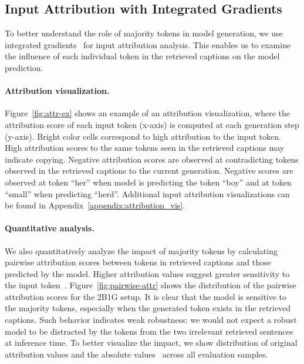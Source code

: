 \subsection{Input Attribution with Integrated Gradients}
\label{subsec:attribution}








To better understand the role of majority tokens in model generation, we use integrated gradients~\citep{ig} for input attribution analysis. This enables us to examine the influence of each individual token in the retrieved captions on the model prediction.

\paragraph*{Attribution visualization.} 
Figure~\ref{fig:attr-ex} shows an example of an attribution visualization, where the attribution score of each input token (x-axis) is computed at each generation step (y-axis). Bright color cells correspond to high attribution to the input token. High attribution scores to the same tokens seen in the retrieved captions may indicate copying. Negative attribution scores are observed at contradicting tokens observed in the retrieved captions to the current generation. Negative scores are observed at token ``her'' when model is predicting the token ``boy'' and at token ``small'' when predicting ``herd''. Additional input attribution visualizations can be found in Appendix~\ref{appendix:attribution_vis}.

\paragraph*{Quantitative analysis.}
We also quantitatively analyze the impact of majority tokens by calculating pairwise attribution scores between tokens in retrieved captions and those predicted by the model. Higher attribution values suggest greater sensitivity to the input token~\cite{ancona2018towards}. Figure~\ref{fig:pairwise-attr} shows the distribution of the pairwise attribution scores for the 2B1G setup. It is clear that the model is sensitive to the majority tokens, especially when the generated token exists in the retrieved captions. Such behavior indicates weak robustness: we would not expect a robust model to be distracted by the tokens from the two irrelevant retrieved sentences at inference time. To better visualize the impact, we show distribution of original attribution values and the absolute values~\cite{ancona2018towards} across all evaluation samples.

